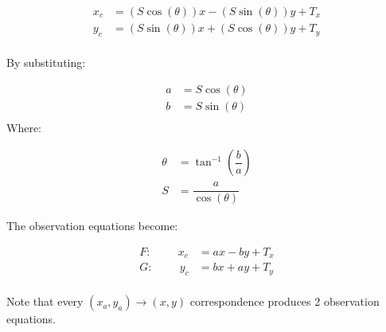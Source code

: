 \begin{align*}
x_c &= (S\cos(\theta))x - (S\sin(\theta))y + T_x \\
y_c &= (S\sin(\theta))x + (S\cos(\theta))y + T_y \\
\end{align*}

By substituting: 

\begin{align*}
	a &= S\cos(\theta) \\
	b &= S\sin(\theta) \\
\end{align*}
Where:

\begin{align*}
	\theta &= \tan^{-1}(\dfrac{b}{a}) \\
	S &= \dfrac{a}{\cos(\theta)}
\end{align*}

The observation equations become:

\begin{align*}
	F: \hspace{1cm} x_c &= ax - by + T_x \\
	G: \hspace{1cm} y_c &= bx + ay + T_y \\
\end{align*}

Note that every $(x_a,y_a)\rightarrow(x,y)$ correspondence produces 2 observation equations.

